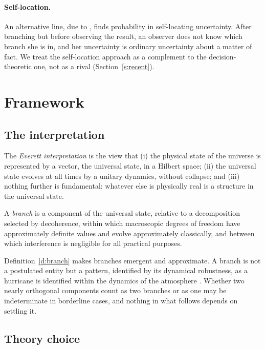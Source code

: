 \documentclass{situationist-preprint}
\begin{document}
\paragraph{Self-location.} An alternative line, due to \citet{Vaidman1998}, finds probability in self-locating uncertainty. After branching but before observing the result, an observer does not know which branch she is in, and her uncertainty is ordinary uncertainty about a matter of fact. We treat the self-location approach as a complement to the decision-theoretic one, not as a rival (Section~\ref{s:recent}).

\section{Framework}\label{s:framework}

\subsection{The interpretation}

\begin{definition}\label{d:everett}
The \emph{Everett interpretation} is the view that (i) the physical state of the universe is represented by a vector, the universal state, in a Hilbert space; (ii) the universal state evolves at all times by a unitary dynamics, without collapse; and (iii) nothing further is fundamental: whatever else is physically real is a structure in the universal state.
\end{definition}

\begin{definition}\label{d:branch}
A \emph{branch} is a component of the universal state, relative to a decomposition selected by decoherence, within which macroscopic degrees of freedom have approximately definite values and evolve approximately classically, and between which interference is negligible for all practical purposes.
\end{definition}

Definition~\ref{d:branch} makes branches emergent and approximate. A branch is not a postulated entity but a pattern, identified by its dynamical robustness, as a hurricane is identified within the dynamics of the atmosphere \citep{Wallace2003a}. Whether two nearly orthogonal components count as two branches or as one may be indeterminate in borderline cases, and nothing in what follows depends on settling it.

\subsection{Theory choice}
\end{document}
